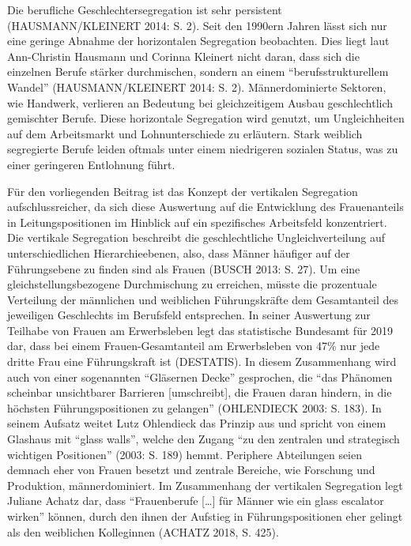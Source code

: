 \documentclass[a4paper,
fontsize=11pt,
oneside,
numbers=noperiodatend,
parskip=half-,
bibliography=totoc,
final
]{scrartcl}
\begin{document}
Die berufliche Geschlechtersegregation ist sehr persistent
(HAUSMANN/KLEINERT 2014: S. 2). Seit den 1990ern Jahren lässt sich nur
eine geringe Abnahme der horizontalen Segregation beobachten. Dies liegt
laut Ann-Christin Hausmann und Corinna Kleinert nicht daran, dass sich
die einzelnen Berufe stärker durchmischen, sondern an einem
\enquote{berufsstrukturellem Wandel} (HAUSMANN/KLEINERT 2014: S. 2).
Männerdominierte Sektoren, wie Handwerk, verlieren an Bedeutung bei
gleichzeitigem Ausbau geschlechtlich gemischter Berufe. Diese
horizontale Segregation wird genutzt, um Ungleichheiten auf dem
Arbeitsmarkt und Lohnunterschiede zu erläutern. Stark weiblich
segregierte Berufe leiden oftmals unter einem niedrigeren sozialen
Status, was zu einer geringeren Entlohnung führt.

Für den vorliegenden Beitrag ist das Konzept der vertikalen Segregation
aufschlussreicher, da sich diese Auswertung auf die Entwicklung des
Frauenanteils in Leitungspositionen im Hinblick auf ein spezifisches
Arbeitsfeld konzentriert. Die vertikale Segregation beschreibt die
geschlechtliche Ungleichverteilung auf unterschiedlichen
Hierarchieebenen, also, dass Männer häufiger auf der Führungsebene zu
finden sind als Frauen (BUSCH 2013: S. 27). Um eine
gleichstellungsbezogene Durchmischung zu erreichen, müsste die
prozentuale Verteilung der männlichen und weiblichen Führungskräfte dem
Gesamtanteil des jeweiligen Geschlechts im Berufsfeld entsprechen. In
seiner Auswertung zur Teilhabe von Frauen am Erwerbsleben legt das
statistische Bundesamt für 2019 dar, dass bei einem Frauen-Gesamtanteil
am Erwerbsleben von 47\% nur jede dritte Frau eine Führungskraft ist
(DESTATIS). In diesem Zusammenhang wird auch von einer sogenannten
\enquote{Gläsernen Decke} gesprochen, die \enquote{das Phänomen
scheinbar unsichtbarer Barrieren {[}umschreibt{]}, die Frauen daran
hindern, in die höchsten Führungspositionen zu gelangen} (OHLENDIECK
2003: S. 183). In seinem Aufsatz weitet Lutz Ohlendieck das Prinzip aus
und spricht von einem Glashaus mit \enquote{glass walls}, welche den
Zugang \enquote{zu den zentralen und strategisch wichtigen Positionen}
(2003: S. 189) hemmt. Periphere Abteilungen seien demnach eher von
Frauen besetzt und zentrale Bereiche, wie Forschung und Produktion,
männerdominiert. Im Zusammenhang der vertikalen Segregation legt Juliane
Achatz dar, dass \enquote{Frauenberufe {[}\ldots{]} für Männer wie ein
glass escalator wirken} können, durch den ihnen der Aufstieg in
Führungspositionen eher gelingt als den weiblichen Kolleginnen (ACHATZ
2018, S. 425).
\end{document}

